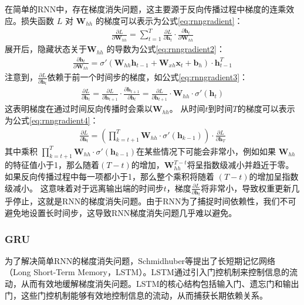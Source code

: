 在简单的RNN中，存在梯度消失问题，这主要源于反向传播过程中梯度的连乘效应\cite{schmidhuber1997long}。损失函数 $L$ 对 $\mathbf{W}_{hh}$ 的梯度可以表示为公式\eqref{eq:rnngradient}：
\begin{align}
  \frac{\partial L}{\partial \mathbf{W}_{hh}} = \sum_{t=1}^{T} \frac{\partial L}{\partial \mathbf{h}_t} \cdot \frac{\partial \mathbf{h}_t}{\partial \mathbf{W}_{hh}} \label{eq:rnngradient}
\end{align}
展开后，隐藏状态关于$\mathbf{W}_{hh}$ 的导数为公式\eqref{eq:rnngradient2}：
\begin{align}
  \frac{\partial \mathbf{h}_t}{\partial \mathbf{W}_{hh}} = \sigma'(\mathbf{W}_{hh} \mathbf{h}_{t-1} + \mathbf{W}_{xh} \mathbf{x}_t + \mathbf{b}_h) \cdot \mathbf{h}_{t-1}^T \label{eq:rnngradient2}
\end{align}
注意到，$\frac{\partial L}{\partial \mathbf{h}_t}$依赖于前一个时间步的梯度，如公式\eqref{eq:rnngradient3}：
\begin{align}
  \frac{\partial L}{\partial \mathbf{h}_t} = \frac{\partial L}{\partial \mathbf{h}_{t+1}} \cdot \frac{\partial \mathbf{h}_{t+1}}{\partial \mathbf{h}_t} = \frac{\partial L}{\partial \mathbf{h}_{t+1}} \cdot \mathbf{W}_{hh} \cdot \sigma'(\mathbf{h}_t) \label{eq:rnngradient3}
\end{align}
这表明梯度在通过时间反向传播时会乘以$\mathbf{W}_{hh}$。
从时间$t$到时间$T$的梯度可以表示为公式\eqref{eq:rnngradient4}：
\begin{align}
  \frac{\partial L}{\partial \mathbf{h}_t} = \left( \prod_{k=t+1}^{T} \mathbf{W}_{hh} \cdot \sigma'(\mathbf{h}_{k-1}) \right) \cdot \frac{\partial L}{\partial \mathbf{h}_T} \label{eq:rnngradient4}
\end{align}
其中乘积 $\prod_{k=t+1}^{T} \mathbf{W}_{hh} \cdot \sigma'(\mathbf{h}_{k-1})$在某些情况下可能会非常小，例如如果 $\mathbf{W}_{hh}$的特征值小于1，那么随着$(T - t)$的增加，$\mathbf{W}_{hh}^{T-t}$将呈指数级减小并趋近于零。
如果反向传播过程中每一项都小于1，那么整个乘积将随着 $(T - t)$的增加呈指数级减小。
这意味着对于远离输出端的时间步$t$，梯度$\frac{\partial L}{\partial \mathbf{h}_t}$将非常小，导致权重更新几乎停止，这就是RNN的梯度消失问题。由于RNN为了捕捉时间依赖性，我们不可避免地设置长时间步，这导致RNN梯度消失问题几乎难以避免。
\subsubsection{GRU}
为了解决简单RNN的梯度消失问题，Schmidhuber等提出了长短期记忆网络（Long Short-Term Memory，LSTM）\cite{schmidhuber1997long}。LSTM通过引入门控机制来控制信息的流动，从而有效地缓解梯度消失问题。LSTM的核心结构包括输入门、遗忘门和输出门，这些门控机制能够有效地控制信息的流动，从而捕获长期依赖关系。

